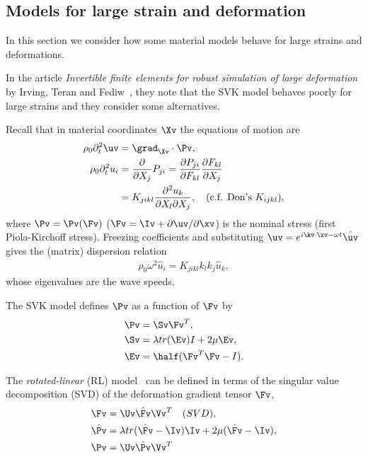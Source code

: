 \subsection{Models for large strain and deformation}


In this section we consider how some material models behave for large strains and deformations.

In the article {\em Invertible finite elements for robust simulation of large deformation}
by Irving, Teran and Fediw~\cite{IrvingTeranFedkiw2004}, they note that the SVK model behaves
poorly for large strains and they consider some alternatives.

Recall that in material coordinates $\Xv$ the equations of motion are
\begin{align}
  \rho_0 \partial_t^2 \uv &= \grad_{\Xv}\cdot \Pv, \\
  \rho_0 \partial_t^2 u_i  &= \frac{\partial}{\partial X_j} P_{ji}  
       =  \frac{\partial P_{ji}}{\partial F_{kl}}  \frac{\partial F_{kl}}{\partial X_j} \\
      & = K_{jikl} \frac{\partial^2 u_k}{\partial X_l\partial X_j}, \quad\text{(c.f. Don's $K_{ijkl}$)}, 
\end{align}
where $\Pv=\Pv(\Fv)$ ($\Fv = \Iv + \partial\uv/\partial\xv$) is the nominal stress (first Piola-Kirchoff stress).
Freezing coefficients and substituting $\uv=e^{i\kv\cdot\xv-\omega t}\hat{\uv}$ gives the (matrix) dispersion relation
\begin{align}
   \rho_0 \omega^2 \hat{u}_i  =  K_{jikl} k_l k_j \hat{u}_k,
\end{align}
whose eigenvalues are the wave speeds. 

The SVK model defines $\Pv$ as a function of $\Fv$ by 
\begin{align}
  \Pv &= \Sv \Fv^T,  \\
  \Sv &= \lambda tr(\Ev) I + 2\mu \Ev, \\ 
  \Ev &= \half( \Fv^T \Fv - I).
\end{align}


\newcommand{\Fvhat}{\hat{\Fv}}
\newcommand{\Phat}{\hat{P}}
\newcommand{\Pvhat}{\hat{\Pv}}
The {\em rotated-linear} (RL) model~\cite{IrvingTeranFedkiw2004} can be defined in terms of the singular value decomposition (SVD) of
the deformation gradient tensor $\Fv$, 
\begin{align}
  \Fv &= \Uv \Fvhat \Vv^T \quad{(SVD)} ,  \\
  \Pvhat &= \lambda tr(\Fvhat-\Iv)\Iv + 2\mu( \Fvhat -\Iv), \\ 
  \Pv &= \Uv \Pvhat \Vv^T 
\end{align}


